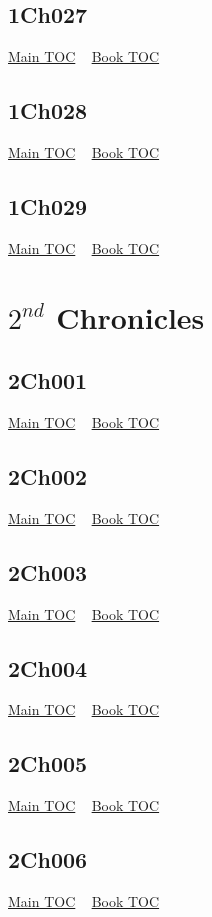 \documentclass{book}
\begin{document}
  \section{1Ch027}\hyperlink{toc}{Main TOC} ~ \hyperref[subsec:1Ch]{Book TOC} 
  \section{1Ch028}\hyperlink{toc}{Main TOC} ~ \hyperref[subsec:1Ch]{Book TOC} 
  \section{1Ch029}\hyperlink{toc}{Main TOC} ~ \hyperref[subsec:1Ch]{Book TOC} 
  \chapter{$2^{nd}$ Chronicles} \label{subsec:2Ch} \begin{multicols}{2} \minitoc \end{multicols}
  \section{2Ch001}\hyperlink{toc}{Main TOC} ~ \hyperref[subsec:2Ch]{Book TOC} 
  \section{2Ch002}\hyperlink{toc}{Main TOC} ~ \hyperref[subsec:2Ch]{Book TOC} 
  \section{2Ch003}\hyperlink{toc}{Main TOC} ~ \hyperref[subsec:2Ch]{Book TOC} 
  \section{2Ch004}\hyperlink{toc}{Main TOC} ~ \hyperref[subsec:2Ch]{Book TOC} 
  \section{2Ch005}\hyperlink{toc}{Main TOC} ~ \hyperref[subsec:2Ch]{Book TOC} 
  \section{2Ch006}\hyperlink{toc}{Main TOC} ~ \hyperref[subsec:2Ch]{Book TOC} 
\end{document}
